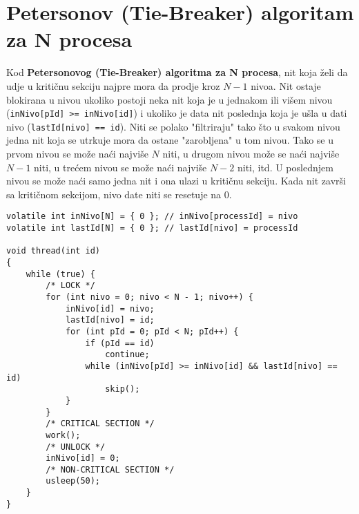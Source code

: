 \clearpage
\section{Petersonov (Tie-Breaker) algoritam za N procesa}
Kod \textbf{Petersonovog (Tie-Breaker) algoritma za N procesa}, nit koja \v{z}eli da udje u kriti\v{c}nu sekciju najpre mora da prodje kroz $N - 1$ nivoa. Nit ostaje blokirana u nivou ukoliko postoji neka nit koja je u jednakom ili vi\v{s}em nivou (\texttt{inNivo[pId] >= inNivo[id]}) i ukoliko je data nit poslednja koja je u\v{s}la u dati nivo (\texttt{lastId[nivo] == id}). Niti se polako "filtriraju" tako \v{s}to u svakom nivou jedna nit koja se utrkuje mora da ostane "zarobljena" u tom nivou. Tako se u prvom nivou se mo\v{z}e na\'{c}i najvi\v{s}e $N$ niti, u drugom nivou mo\v{z}e se na\'{c}i najvi\v{se} $N-1$ niti, u tre\'{c}em nivou se mo\v{z}e na\'{c}i najvi\v{s}e $N-2$ niti, itd. U poslednjem nivou se mo\v{z}e na\'{c}i samo jedna nit i ona ulazi u kriti\v{c}nu sekciju. Kada nit zavr\v{s}i sa kriti\v{c}nom sekcijom, nivo date niti se resetuje na 0.
\begin{lstlisting}
volatile int inNivo[N] = { 0 }; // inNivo[processId] = nivo
volatile int lastId[N] = { 0 }; // lastId[nivo] = processId

void thread(int id)
{
    while (true) {
		/* LOCK */
        for (int nivo = 0; nivo < N - 1; nivo++) {
            inNivo[id] = nivo;
            lastId[nivo] = id;
            for (int pId = 0; pId < N; pId++) {
                if (pId == id)
                    continue;
                while (inNivo[pId] >= inNivo[id] && lastId[nivo] == id) 
                    skip();
            }
        }
		/* CRITICAL SECTION */
        work();
		/* UNLOCK */
        inNivo[id] = 0;
		/* NON-CRITICAL SECTION */
        usleep(50);
    }
}
\end{lstlisting}